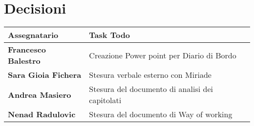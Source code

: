 \documentclass[a4paper,12pt]{article}
\begin{document}
\section{Decisioni}

\begin{tabularx}{\textwidth}{|l|X|}
\hline
\textbf{Assegnatario} & \textbf{Task Todo} \\
\hline
\textbf{Francesco Balestro} & Creazione Power point per Diario di Bordo \\
\hline
\textbf{Sara Gioia Fichera} & Stesura verbale esterno con Miriade
\\
\hline
\textbf{Andrea Masiero} &Stesura del documento di analisi dei capitolati\\
\hline
\textbf{Nenad Radulovic} & Stesura del documento di Way of working\\
\hline
\end{tabularx}
\end{document}

